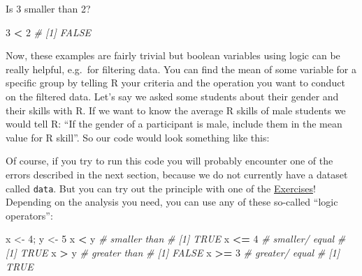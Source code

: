 \documentclass[
]{book}
\newenvironment{Shaded}{\begin{snugshade}}{\end{snugshade}}
\newcommand{\CommentTok}[1]{\textcolor[rgb]{0.56,0.35,0.01}{\textit{#1}}}
\newcommand{\DecValTok}[1]{\textcolor[rgb]{0.00,0.00,0.81}{#1}}
\newcommand{\FunctionTok}[1]{\textcolor[rgb]{0.13,0.29,0.53}{\textbf{#1}}}
\newcommand{\NormalTok}[1]{#1}
\newcommand{\OtherTok}[1]{\textcolor[rgb]{0.56,0.35,0.01}{#1}}
\newcommand{\SpecialCharTok}[1]{\textcolor[rgb]{0.81,0.36,0.00}{\textbf{#1}}}
\newcommand{\StringTok}[1]{\textcolor[rgb]{0.31,0.60,0.02}{#1}}
\begin{document}
Is 3 smaller than 2?

\begin{Shaded}
\begin{Highlighting}[]
\DecValTok{3} \SpecialCharTok{\textless{}} \DecValTok{2}
\CommentTok{\# [1] FALSE}
\end{Highlighting}
\end{Shaded}

Now, these examples are fairly trivial but boolean variables using logic can be really helpful, e.g.~for filtering data.
You can find the mean of some variable for a specific group by telling R your criteria and the operation you want to conduct on the filtered data.
Let's say we asked some students about their gender and their skills with R.
If we want to know the average R skills of male students we would tell R: ``If the gender of a participant is male, include them in the mean value for R skill''.
So our code would look something like this:

\begin{Shaded}
\end{Shaded}

Of course, if you try to run this code you will probably encounter one of the errors described in the next section, because we do not currently have a dataset called \texttt{data}.
But you can try out the principle with one of the \hyperref[exercises]{Exercises}!
Depending on the analysis you need, you can use any of these so-called ``logic operators'':

\begin{Shaded}
\begin{Highlighting}[]
\NormalTok{x }\OtherTok{\textless{}{-}} \DecValTok{4}\NormalTok{; y }\OtherTok{\textless{}{-}} \DecValTok{5}
\NormalTok{x }\SpecialCharTok{\textless{}}\NormalTok{ y }\CommentTok{\# smaller than}
\CommentTok{\# [1] TRUE}
\NormalTok{x }\SpecialCharTok{\textless{}=} \DecValTok{4} \CommentTok{\# smaller/ equal}
\CommentTok{\# [1] TRUE}
\NormalTok{x }\SpecialCharTok{\textgreater{}}\NormalTok{ y }\CommentTok{\# greater than}
\CommentTok{\# [1] FALSE}
\NormalTok{x }\SpecialCharTok{\textgreater{}=} \DecValTok{3} \CommentTok{\# greater/ equal}
\CommentTok{\# [1] TRUE}
\end{Highlighting}
\end{Shaded}
\end{document}
